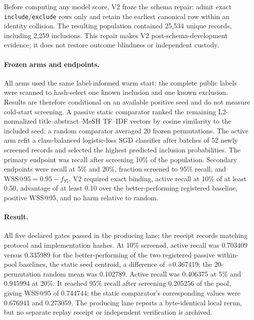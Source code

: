 Before computing any model score, V2 froze the schema repair: admit exact
\texttt{include}/\texttt{exclude} rows only and retain the earliest canonical
row within an identity collision.  The resulting population contained 25,534
unique records, including 2,259 inclusions.  This repair makes V2
post-schema-development evidence; it does not restore outcome blindness or
independent custody.

\paragraph{Frozen arms and endpoints.}
All arms used the same label-informed warm start: the complete public labels
were scanned to hash-select one known inclusion and one known exclusion.
Results are therefore conditional on an available positive seed and do not
measure cold-start screening. A
passive static comparator ranked the remaining L2-normalized title--abstract--MeSH
TF--IDF vectors by cosine similarity to the included seed; a random comparator
averaged 20 frozen permutations.  The active arm refit a class-balanced
logistic-loss SGD classifier after batches of 52 newly screened records and
selected the highest predicted inclusion probabilities.  The primary endpoint
was recall after screening 10\% of the population.  Secondary endpoints were
recall at 5\% and 20\%, fraction screened to 95\% recall, and
$\mathrm{WSS}@95=0.95-f_{95}$.  V2 required exact binding, active recall at
10\% of at least 0.50, advantage of at least 0.10 over the better-performing
registered baseline, positive WSS@95, and no harm relative to random.

\paragraph{Result.}
All five declared gates passed in the producing lane; the receipt records
matching protocol and implementation hashes. At 10\% screened, active recall was 0.703409 versus
0.335989 for the better-performing of the two registered passive within-pool baselines,
the static seed centroid, a difference of
+0.367419; the 20-permutation random mean was 0.102789.  Active recall was
0.406375 at 5\% and 0.945994 at 20\%.  It reached 95\% recall after screening
0.205256 of the pool, giving WSS@95 of 0.744744; the static comparator's
corresponding values were 0.676941 and 0.273059. The producing lane reports a
byte-identical local rerun, but no separate replay receipt or independent
verification is archived.

